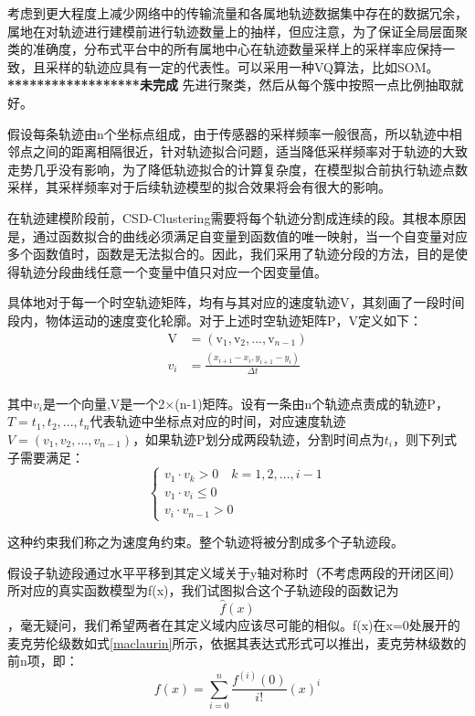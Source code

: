 考虑到更大程度上减少网络中的传输流量和各属地轨迹数据集中存在的数据冗余，属地在对轨迹进行建模前进行轨迹数量上的抽样，但应注意，为了保证全局层面聚类的准确度，分布式平台中的所有属地中心在轨迹数量采样上的采样率应保持一致，且采样的轨迹应具有一定的代表性。可以采用一种VQ算法，比如SOM。\\
\textbf{******************未完成}
先进行聚类，然后从每个簇中按照一点比例抽取就好。

假设每条轨迹由n个坐标点组成，由于传感器的采样频率一般很高，所以轨迹中相邻点之间的距离相隔很近，针对轨迹拟合问题，适当降低采样频率对于轨迹的大致走势几乎没有影响，为了降低轨迹拟合的计算复杂度，在模型拟合前执行轨迹点数采样，其采样频率对于后续轨迹模型的拟合效果将会有很大的影响。

在轨迹建模阶段前，CSD-Clustering需要将每个轨迹分割成连续的段。其根本原因是，通过函数拟合的曲线必须满足自变量到函数值的唯一映射，当一个自变量对应多个函数值时，函数是无法拟合的。因此，我们采用了轨迹分段的方法，目的是使得轨迹分段曲线任意一个变量中值只对应一个因变量值。

具体地对于每一个时空轨迹矩阵，均有与其对应的速度轨迹V，其刻画了一段时间段内，物体运动的速度变化轮廓。对于上述时空轨迹矩阵P，V定义如下：
\[\begin{aligned}
	\text{V}&=\left( \text{v}_1,\text{v}_2,...,\text{v}_{n-1} \right)\\
	v_i&=\frac{\left( x_{i+1}-x_i,y_{i+1}-y_i \right)}{\varDelta t}\\
\end{aligned}\]

其中$v_i$是一个向量,V是一个2×(n-1)矩阵。设有一条由n个轨迹点责成的轨迹P，$T={t_1,t_2,...,t_n}$代表轨迹中坐标点对应的时间，对应速度轨迹$V=(v_1,v_2,...,v_{n-1})$，如果轨迹P划分成两段轨迹，分割时间点为$t_i$，则下列式子需要满足：
\[
\left\{\begin{array}{c}
{v_{1} \cdot v_{k}>0 \quad k=1,2, \ldots, i-1} \\
{v_{1} \cdot v_{i} \leq 0} \\
{v_{i} \cdot v_{n-1}>0}
\end{array}\right.
\]

这种约束我们称之为速度角约束。整个轨迹将被分割成多个子轨迹段。

假设子轨迹段通过水平平移到其定义域关于y轴对称时（不考虑两段的开闭区间）所对应的真实函数模型为f(x)，我们试图拟合这个子轨迹段的函数记为$$\hat{f}\left( x \right) $$，毫无疑问，我们希望两者在其定义域内应该尽可能的相似。f(x)在x=0处展开的麦克劳伦级数如式\ref{maclaurin}所示，依据其表达式形式可以推出，麦克劳林级数的前n项，即：
\begin{equation}
\label{mac_n}
f\left( x \right) =\sum_{i=0}^n{\frac{f^{\left( i \right)}\left( 0 \right)}{i!}}\left( x \right) ^i
\end{equation}

